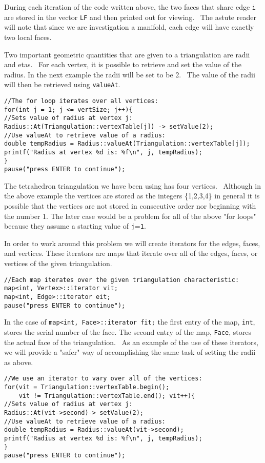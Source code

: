 \documentclass{amsart}
\theoremstyle{plain}
\numberwithin{equation}{section}
\begin{document}
\bigskip 

During each iteration of the code written above, the two faces that share
edge \verb|i| are stored in the vector \verb|LF| and then printed out for
viewing. \ The astute reader will note that since we are investigation a
manifold, each edge will have exactly two local faces.

Two important geometric quantities that are given to a triangulation are
radii and etas. \ For each vertex, it is possible to retrieve and set the
value of the radius.  In the next example the radii will be set to be 2. \
The value of the radii will then be retrieved using \verb|valueAt|. \newline
\begin{verbatim}
//The for loop iterates over all vertices:
for(int j = 1; j <= vertSize; j++){
//Sets value of radius at vertex j:
Radius::At(Triangulation::vertexTable[j]) -> setValue(2);
//Use valueAt to retrieve value of a radius:
double tempRadius = Radius::valueAt(Triangulation::vertexTable[j]);
printf("Radius at vertex %d is: %f\n", j, tempRadius);
}
pause("press ENTER to continue");
\end{verbatim}

\bigskip 

The tetrahedron triangulation we have been using has four vertices. \
Although in the above example the vertices are stored as the integers
\{1,2,3,4\} in general it is possible that the vertices are not stored in
consecutive order nor beginning with the number 1. The later case would be a
problem for all of the above "for loops" because they assume a starting
value of \verb|j|=\verb|1|.

In order to work around this problem we will create iterators for the edges,
faces, and vertices. These iterators are maps that iterate over all of the
edges, faces, or vertices of the given triangulation. \newline
\begin{verbatim}
//Each map iterates over the given triangulation characteristic:
map<int, Vertex>::iterator vit;
map<int, Edge>::iterator eit;
pause("press ENTER to continue");
\end{verbatim}

\bigskip 

In the case of \verb|map<int, Face>::iterator fit;| the first entry of the
map, \verb|int|, stores the serial number of the face. The second entry of
the map, \verb|Face|, stores the actual face of the triangulation. \ As an
example of the use of these iterators, we will provide a "safer" way of
accomplishing the same task of setting the radii as above.\newline
\begin{verbatim}
//We use an iterator to vary over all of the vertices:
for(vit = Triangulation::vertexTable.begin();
    vit != Triangulation::vertexTable.end(); vit++){
//Sets value of radius at vertex j:
Radius::At(vit->second)-> setValue(2);
//Use valueAt to retrieve value of a radius:
double tempRadius = Radius::valueAt(vit->second);
printf("Radius at vertex %d is: %f\n", j, tempRadius);
}
pause("press ENTER to continue");
\end{verbatim}
\end{document}

